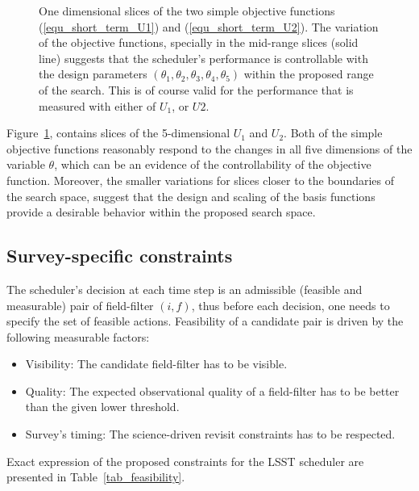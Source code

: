 \documentclass[12pt]{aastex62}
\theoremstyle{definition}
\begin{document}
\begin{figure}[h]
\caption{One dimensional slices of the two simple objective functions (\ref{equ_short_term_U1}) and (\ref{equ_short_term_U2}). The variation of the objective functions, specially in the mid-range slices (solid line) suggests that the scheduler's performance is controllable with the design parameters $(\theta_1,\theta_2,\theta_3,\theta_4,\theta_5)$ within the proposed range of the search. This is of course valid for the performance that is measured with either of $U_1$, or $U2$.}
\label{fig_controlability}
\end{figure}

Figure~\ref{fig_controlability}, contains slices of the 5-dimensional $U_1$ and $U_2$. Both of the simple objective functions reasonably respond to the changes in all five dimensions of the variable $\theta$, which can be an evidence of the controllability of the objective function. Moreover, the smaller variations for slices closer to the boundaries of the search space, suggest that the design and scaling of the basis functions provide a desirable behavior within the proposed search space.

\subsection{Survey-specific constraints}\label{sec_cstr}

The scheduler's decision at each time step is an admissible (feasible and measurable) pair of field-filter $(i,f)$, thus before each decision, one needs to specify the set of feasible actions. Feasibility of a candidate pair is driven by the following measurable factors:

\begin{itemize}
\item Visibility: The candidate field-filter has to be visible.
\item Quality: The expected observational quality of a field-filter has to be better than the given lower threshold.
\item Survey's timing: The science-driven revisit constraints has to be respected.
\end{itemize}

Exact expression of the proposed constraints for the LSST scheduler are presented in Table~\ref{tab_feasibility}.
\end{document}
